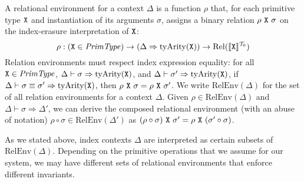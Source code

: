 A relational environment for a context $\Delta$ is a %
function $\rho$ that, for each primitive type $\textup{\texttt{X}}$ and
instantiation of its arguments $\sigma$, assigns a binary relation
$\rho\ \tyPrimNm{X}\ \sigma$ on the index-erasure interpretation of
$\textup{\texttt{X}}$:
\begin{displaymath}
  \rho : (\textup{\texttt{X}} \in \mathit{PrimType}) \to (\Delta \Rightarrow \mathrm{tyArity}(\textup{\texttt{X}})) \to \mathrm{Rel}(\llbracket \textup{\texttt{X}} \rrbracket^{\mathcal{T}_0})
\end{displaymath}
Relation environments must respect index expression equality: for
all $\textup{\texttt{X}} \in \mathit{PrimType}$,
$\Delta \vdash \sigma \Rightarrow
\mathrm{tyArity}(\textup{\texttt{X}})$, and $\Delta \vdash \sigma' \Rightarrow
\mathrm{tyArity}(\textup{\texttt{X}})$, if $\Delta \vdash \sigma \equiv \sigma'
\Rightarrow \mathrm{tyArity}(\textup{\texttt{X}})$, then $\rho\ \textup{\texttt{X}}\
\sigma = \rho\ \textup{\texttt{X}}\ \sigma'$.
%
We write $\mathrm{RelEnv}(\Delta)$ for the set of all relation
environments for a context $\Delta$. Given %
$\rho \in \mathrm{RelEnv}(\Delta)$ and %
$\Delta \vdash \sigma \Rightarrow \Delta'$, we can derive the composed
relational environment (with an abuse of notation) $\rho \circ \sigma
\in \mathrm{RelEnv}(\Delta')$ as $(\rho \circ \sigma)\ \textup{\texttt{X}}\
\sigma' = \rho\ \textup{\texttt{X}}\ (\sigma' \circ \sigma)$.

As we stated above, index contexts $\Delta$ are interpreted as certain
subsets of $\mathrm{RelEnv}(\Delta)$. Depending on the primitive
operations that we assume for our system, we may have different sets
of relational environments that enforce different invariants. 

